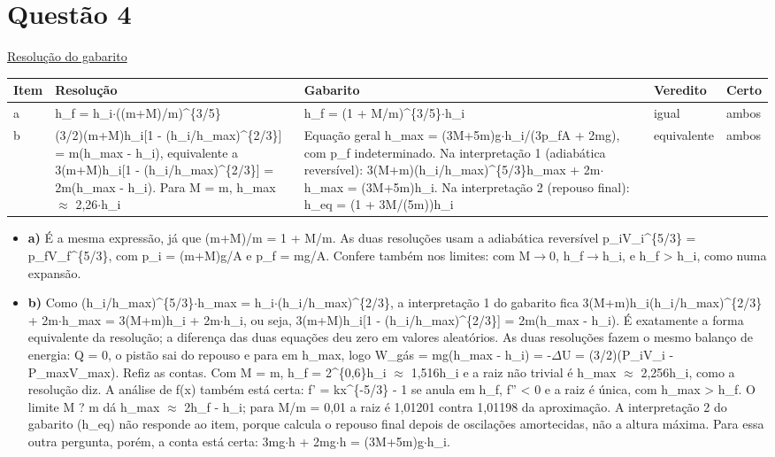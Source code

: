 \documentclass{article}%
\begin{document}
\section*{Questão 4}%
\href{https://poliedroresolve.sistemapoliedro.com.br/vestibulares/ita/2027/ita-2-fase-dia-3-22-10-2026-2-fase-dia-3/dissertativa-4-fisica-2-fase-dia-3-ita-2027}{Resolução do gabarito}\par\smallskip%
\begin{longtable}{@{}p{} p{} p{} p{} p{}@{}}\toprule Item & Resolução & Gabarito & Veredito & Certo \\ \midrule
a & h\_f = h\_i$\cdot$((m+M)/m)\^{}\{3/5\} & h\_f = (1 + M/m)\^{}\{3/5\}$\cdot$h\_i & igual & ambos \\
b & (3/2)(m+M)h\_i{[}1 - (h\_i/h\_max)\^{}\{2/3\}{]} = m(h\_max - h\_i), equivalente a 3(m+M)h\_i{[}1 - (h\_i/h\_max)\^{}\{2/3\}{]} = 2m(h\_max - h\_i). Para M = m, h\_max $\approx$ 2,26$\cdot$h\_i & Equação geral h\_max = (3M+5m)g$\cdot$h\_i/(3p\_fA + 2mg), com p\_f indeterminado. Na interpretação 1 (adiabática reversível): 3(M+m)(h\_i/h\_max)\^{}\{5/3\}h\_max + 2m$\cdot$h\_max = (3M+5m)h\_i. Na interpretação 2 (repouso final): h\_eq = (1 + 3M/(5m))h\_i & equivalente & ambos \\
\bottomrule\end{longtable}%
\begin{itemize}%
\item%
\textbf{a)} É a mesma expressão, já que (m+M)/m = 1 + M/m. As duas resoluções usam a adiabática reversível p\_iV\_i\^{}\{5/3\} = p\_fV\_f\^{}\{5/3\}, com p\_i = (m+M)g/A e p\_f = mg/A. Confere também nos limites: com M$\to$0, h\_f$\to$h\_i, e h\_f > h\_i, como numa expansão.%
\item%
\textbf{b)} Como (h\_i/h\_max)\^{}\{5/3\}$\cdot$h\_max = h\_i$\cdot$(h\_i/h\_max)\^{}\{2/3\}, a interpretação 1 do gabarito fica 3(M+m)h\_i(h\_i/h\_max)\^{}\{2/3\} + 2m$\cdot$h\_max = 3(M+m)h\_i + 2m$\cdot$h\_i, ou seja, 3(m+M)h\_i{[}1 - (h\_i/h\_max)\^{}\{2/3\}{]} = 2m(h\_max - h\_i). É exatamente a forma equivalente da resolução; a diferença das duas equações deu zero em valores aleatórios. As duas resoluções fazem o mesmo balanço de energia: Q = 0, o pistão sai do repouso e para em h\_max, logo W\_gás = mg(h\_max - h\_i) = -$\Delta$U = (3/2)(P\_iV\_i - P\_maxV\_max). Refiz as contas. Com M = m, h\_f = 2\^{}\{0,6\}h\_i $\approx$ 1,516h\_i e a raiz não trivial é h\_max $\approx$ 2,256h\_i, como a resolução diz. A análise de f(x) também está certa: f' = kx\^{}\{-5/3\} - 1 se anula em h\_f, f'' < 0 e a raiz é única, com h\_max > h\_f. O limite M ? m dá h\_max $\approx$ 2h\_f - h\_i; para M/m = 0,01 a raiz é 1,01201 contra 1,01198 da aproximação. A interpretação 2 do gabarito (h\_eq) não responde ao item, porque calcula o repouso final depois de oscilações amortecidas, não a altura máxima. Para essa outra pergunta, porém, a conta está certa: 3mg$\cdot$h + 2mg$\cdot$h = (3M+5m)g$\cdot$h\_i.%
\end{itemize}%
\end{document}
